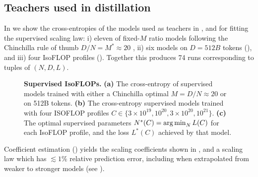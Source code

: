 \clearpage
\subsection{Teachers used in distillation}
\label{ssec:teachers-used-in-distillation}

In  we show the cross-entropies of the models used as teachers in ,
and for fitting the supervised scaling law:
i) eleven of fixed-$M$ ratio models following the Chinchilla rule of thumb $D/N=M^*\approx20$ \citep{DBLP:journals/corr/abs-2203-15556},
ii) six models on $D=512B$ tokens (), and
iii) four IsoFLOP profiles ().
Together this produces 74 runs corresponding to tuples of $(N,D,L)$. 


\begin{figure}[h]
	\centering
        \vspace{-0.7cm}
        \hfill
	\hfill
        \vspace{-0.1cm}
	\caption{\textbf{Supervised IsoFLOPs.}
        \textbf{(a)} The cross-entropy of supervised models trained with either a Chinchilla optimal $M=D/N\approx 20$ or on 512B tokens.
	\textbf{(b)} The cross-entropy supervised models trained with four ISOFLOP profiles $C\in\{3\times10^{19},10^{20},3\times10^{20},10^{21}\}$.
	\textbf{(c)} The optimal supervised parameters $N^*(C)=\operatorname*{arg\,min}_{N} L(C)$ for each IsoFLOP profile, and the loss $L^*(C)$ achieved by that model.}
        \vspace{-0.1cm}
	\label{fig:supervised-models}
\end{figure}
Coefficient estimation ()
yields the scaling coefficients shown in
,
and a scaling law which has $\lesssim1\%$ relative prediction error, including when extrapolated from weaker to stronger models (see ).

\FloatBarrier

